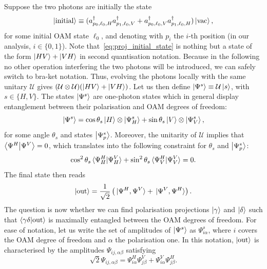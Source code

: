 \documentclass[
	aps, pra, authorblock, superscriptaddress, twocolumn,
	10pt
]{revtex4-1}
\newcommand{\on}[1]{\operatorname{#1}}
\newcommand{\U}{\mathcal{U}}
\begin{document}
Suppose the two photons are initially the state
\begin{equation}
    \ket{\on{initial}}\equiv
    (a_{p_0,\ell_0,H}^\dagger
    a_{p_1,\ell_0,V}^\dagger +
    a_{p_0,\ell_0,V}^\dagger
    a_{p_1,\ell_0,H}^\dagger) \ket{\mathrm{vac}},
    \label{eq:proj_initial_state}
\end{equation}
for some initial OAM state $\ell_0$, and denoting with $p_i$ the $i$-th position (in our analysis, $i\in\{0,1\}$).
Note that~\cref{eq:proj_initial_state} is nothing but a state of the form $\ket{HV}+\ket{VH}$ in second quantisation notation.
Because in the following no other operation interfering the two photons will be introduced, we can safely switch to bra-ket notation.
Thus, evolving the photons locally with the same unitary $\U$ gives
$(\U\otimes\U)(\ket{HV}+\ket{VH})$.
Let us then define
$\ket{\Psi^s}\equiv\U\ket s$, with $s\in\{H,V\}$.
The states $\ket{\Psi^s}$ are one-photon states which in general display entanglement between their polarisation and OAM degrees of freedom:
\begin{equation}
    \ket{\Psi^s}=
    \cos\theta_s \ket H\otimes\ket{\Psi^s_{H}} +
    \sin\theta_s \ket V\otimes\ket{\Psi^s_{V}},
\end{equation}
for some angle $\theta_s$ and states $\ket{\Psi^s_p}$.
Moreover, the unitarity of $\U$ implies that $\braket{\Psi^H}{\Psi^V}=0$, which translates into the following constraint for $\theta_s$ and $\ket{\Psi^s_p}$:
\begin{equation}
    \cos^2\theta_s\braket*{\Psi^H_H}{\Psi^V_H} +
    \sin^2\theta_s\braket*{\Psi^H_V}{\Psi^V_V} = 0.
\end{equation}
The final state then reads
\begin{equation}
    \ket{\on{out}}
    = \frac{1}{\sqrt2}\left(
    \ket*{\Psi^H,\Psi^V} + \ket*{\Psi^V,\Psi^H}
    \right).
    \label{eq:proj_output_state}
\end{equation}
The question is now whether we can find polarisation projections $\ket\gamma$ and $\ket\delta$ such that $\braket{\gamma\delta}{\on{out}}$ is maximally entangled between the OAM degrees of freedom.
For ease of notation, let us write the set of amplitudes of $\ket{\Psi^s}$ as $\Psi^s_{i\alpha}$, where $i$ covers the OAM degree of freedom and $\alpha$ the polarisation one.
In this notation, $\ket{\on{out}}$ is characterised by the amplitudes $\Psi_{ij,\alpha\beta}$ satisfying
\begin{equation}
    \sqrt2 \Psi_{ij,\alpha\beta} =
    \Psi^H_{i\alpha} \Psi^V_{j\beta} +
    \Psi^V_{i\alpha} \Psi^H_{j\beta}.
\end{equation}
\end{document}
